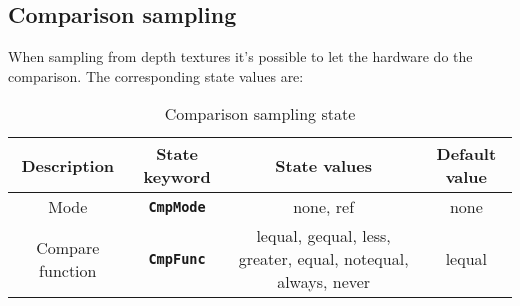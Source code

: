 \documentclass[11pt,a4paper,final,titlepage]{article}
\begin{document}
\subsection{Comparison sampling}
When sampling from depth textures it's possible to let the hardware do the comparison.
The corresponding state values are:
\begin{table}[h]
\centering
\begin{tabulary}{\linewidth}{|C|C|C|C|}
\hline
Description & State keyword & State values & Default value\\
\hline\hline
Mode & \texttt{\textbf{CmpMode}} & none, ref & none\\
\hline
Compare function & \texttt{\textbf{CmpFunc}} &
lequal, gequal, less, greater, equal, notequal, always, never & lequal\\
\hline
\end{tabulary}
\caption{Comparison sampling state}
\label{tab:compModes}
\end{table}
\end{document}
